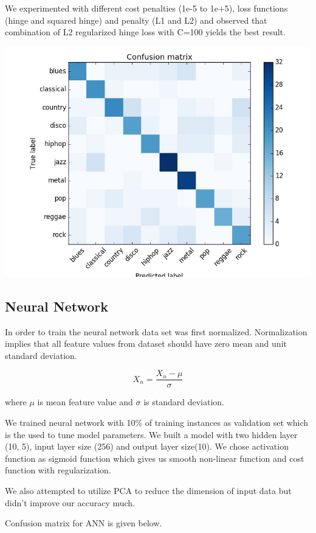 \documentclass[conference]{IEEEtran}
\begin{document}
 We experimented with different cost penalties (1e-5 to 1e+5), loss functions (hinge and squared hinge) and penalty (L1 and L2) and observed that combination of L2 regularized hinge loss with C=100 yields the best result.

\includegraphics[width=\columnwidth]{LINEARSVC}

\subsection{Neural Network}
\label{sub:Neural Network}
In order to train the neural network data set was first normalized. Normalization implies that all feature values from dataset should have zero mean and unit standard deviation.

$$ X_n = \frac{X_n - \mu}{\sigma}$$

where $\mu$ is mean feature value and $ \sigma $ is standard deviation.

We trained neural network with 10\% of training instances as validation set which is the used to tune model parameters. We built a model with two hidden layer (10, 5), input layer size (256) and output layer size(10). We chose activation function as sigmoid function which gives us smooth non-linear function and cost function with regularization.


We also attempted to utilize PCA to reduce the dimension of input data but didn't improve our accuracy much.

Confusion matrix for ANN is given below.
\end{document}
